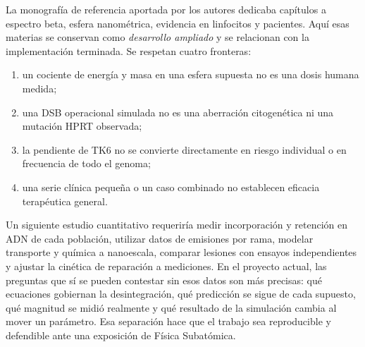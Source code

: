 La monografía de referencia aportada por los autores dedicaba capítulos
a espectro beta, esfera nanométrica, evidencia en linfocitos y pacientes.
Aquí esas materias se conservan como \emph{desarrollo ampliado} y se
relacionan con la implementación terminada. Se respetan cuatro fronteras:
\begin{enumerate}[leftmargin=*,itemsep=2pt]
\item un cociente de energía y masa en una esfera supuesta no es una dosis
      humana medida;
\item una DSB operacional simulada no es una aberración citogenética ni una
      mutación HPRT observada;
\item la pendiente de TK6 no se convierte directamente en riesgo individual
      o en frecuencia de todo el genoma;
\item una serie clínica pequeña o un caso combinado no establecen eficacia
      terapéutica general.
\end{enumerate}

Un siguiente estudio cuantitativo requeriría medir incorporación y
retención en ADN de cada población, utilizar datos de emisiones por rama,
modelar transporte y química a nanoescala, comparar lesiones con ensayos
independientes y ajustar la cinética de reparación a mediciones. En el
proyecto actual, las preguntas que sí se pueden contestar sin esos datos
son más precisas: qué ecuaciones gobiernan la desintegración, qué
predicción se sigue de cada supuesto, qué magnitud se midió realmente y
qué resultado de la simulación cambia al mover un parámetro. Esa
separación hace que el trabajo sea reproducible y defendible ante una
exposición de Física Subatómica.

